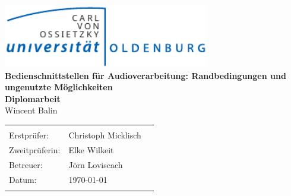 \begin{titlepage}
	\begin{center}
	\includegraphics[width=9cm]{img/Uni-Logo.pdf}\\[3.2cm]
	{
		\sffamily\bfseries
		\Large{Bedienschnittstellen für Audioverarbeitung: Randbedingungen und ungenutzte Möglichkeiten}\\[5ex]
			
		\large{Diplomarbeit}\\[5ex]
	}			
	\Large{Wincent Balin}
	\end{center}
	
	\vfill
	
	\begin{center}
		\begin{tabular}{@{}p{3.2cm}p{3.7cm}p{0.2cm}@{}}
			\hline \\[3mm]
			Erstprüfer:    & Christoph Micklisch & \\[2mm]
			Zweitprüferin: & Elke Wilkeit & \\[2mm]
			Betreuer:      & Jörn Loviscach & \\[2mm]
			Datum:	       & \today & \\[6mm]
			\hline \\
		\end{tabular}
	\end{center}
	
\end{titlepage}